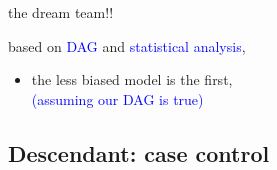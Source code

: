 %
%
\begin{lhframe}[rhgraphic={\texttt{[image: descendant2\_reg1.png]}}]
	{the dream team!!}
	
	based on \textcolor{blue}{DAG} and \textcolor{blue}{statistical analysis},
	\begin{itemize}
		\item the less biased model is the first, \\
		{\small \textcolor{blue}{(assuming our DAG is true)} }
	\end{itemize}
\end{lhframe}
%
%
\subsection{Descendant: case control}
%
%
\begin{frame}[t, negative]
	\subsectionpage
\end{frame}
%
%
